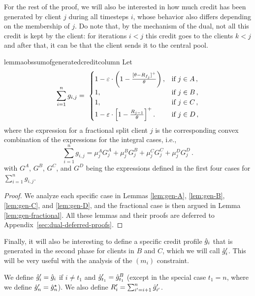 For the rest of the proof, we will also be interested in how much credit has been generated by client $j$ during all timesteps $i$, whose behavior also differs depending on the membership of $j$. Do note that, by the mechanism of the dual, not all this credit is kept by the client: for iterations $i<j$ this credit goes to the clients $k<j$ and after that, it can be that the client sends it to the central pool.
\begin{restatable}{lemma}{obssumofgeneratedcreditcolumn}\label{obs:sum-of-generated-credit-column}
    Let
    \begin{equation*}
        \sum_{i=1}^n g_{i,j} = 
        \ \begin{cases}
            1 - \varepsilon \cdot \left(1 - \frac{[\theta - R_{f_j}]^+}{\theta}\right),
            & \text{if $j \in A$}\,,\\
            1,
            & \text{if $j \in B$}\,,\\
            1,
            & \text{if $j \in C$}\,,\\
            1 - \varepsilon \cdot \left[1 - \frac{R_{j-1}}{\theta}\right]^+.
            & \text{if $j \in D$}\,,\\
        \end{cases}
    \end{equation*}
    where the expression for a fractional split client $j$ is the corresponding convex combination of the expressions for the integral cases, i.e.,
    \begin{equation*}
        \sum_{i=1}^n g_{i,j} = \mu_j^A G_j^A + \mu_j^B G_j^B + \mu_j^C G_j^C + \mu_j^D G_j^D\,.
    \end{equation*}
    with $G^A$, $G^B$, $G^C$, and $G^D$ being the expressions defined in the first four cases for $\sum_{i=1}^n g_{i,j}$.
\end{restatable}
\begin{proof}
We analyze each specific case in Lemmas \ref{lem:gen-A}, \ref{lem:gen-B}, \ref{lem:gen-C}, and \ref{lem:gen-D}, and the fractional case is then argued in Lemma \ref{lem:gen-fractional}. All these lemmas and their proofs are deferred to Appendix~\ref{sec:dual-deferred-proofs}.
\end{proof}
Finally, it will also be interesting to define a specific credit profile $\hat{g}_i$ that is generated in the second phase for clients in $B$ and $C$, which we will call $\hat{g}'_i$. This will be very useful with the analysis of the $(m_i)$ constraint.
\begin{definition}
We define $\hat{g}'_i = \hat{g}_i$ if $i \neq t_1$ and $\hat{g}'_{t_1} = \hat{g}_{t_1}^B$ (except in the special case $t_1 = n$, where we define $\hat{g}'_{n} = \hat{g}_n^\star$). We also define $R'_i = \sum_{i'=i+1}^n \hat{g}'_{i'}$.
\end{definition}

